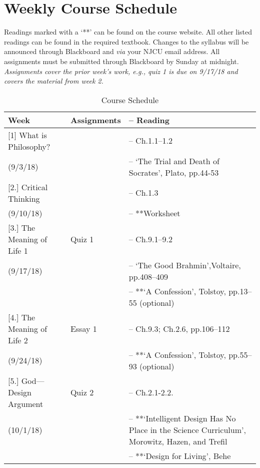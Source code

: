 \documentclass[article,oneside]{memoir}
\begin{document}
\section{Weekly Course Schedule}
Readings marked with a `**' can be found on the course website. All other listed readings can be found in the required textbook. Changes to the syllabus will be announced through Blackboard and \emph{via} your NJCU email address.  All assignments must be submitted through Blackboard by Sunday at midnight. \emph{Assignments cover the prior week's work, e.g., quiz 1 is due on 9/17/18 and covers the material from week 2.}
\noindent 

\begin{center}
\begin{longtable}{p{4.5cm}p{2cm}>{-- }p{6cm}}
 
  \caption{Course Schedule} \\
  \toprule
  \textbf{Week} &\textbf{Assignments } & \textbf{Reading} \\
  \midrule

  

[1] What is Philosophy?		& 	 			& Ch.1.1--1.2  \\
(9/3/18)					&				&  `The Trial and Death of Socrates', Plato, pp.44-53   \\  [1.8\baselineskip]

[2.] Critical Thinking		 	& 				&  Ch.1.3 \\
(9/10/18)					&				&  **Worksheet \\  [1.8\baselineskip]

[3.] The Meaning of Life 1		& Quiz 1			&  Ch.9.1--9.2 \\
(9/17/18)					&				&  `The Good Brahmin',Voltaire, pp.408--409 \\
						&				& **`A Confession', Tolstoy, pp.13--55 (optional)\\ [1.8\baselineskip]
	
[4.] The Meaning of Life 2		& Essay 1			&  Ch.9.3;  Ch.2.6, pp.106--112\\
(9/24/18)					& 				&  **`A Confession', Tolstoy, pp.55--93 (optional) \\  [1.8\baselineskip]

[5.] God---Design Argument 	& Quiz 2			& Ch.2.1-2.2.\\ 
(10/1/18)					&				& **`Intelligent Design Has No Place in the Science Curriculum', Morowitz, Hazen, and Trefil\\
						&				& **`Design for Living', Behe\\   [1.8\baselineskip]


\end{longtable}
\end{center}
\end{document}
